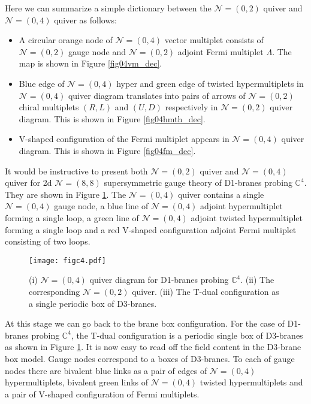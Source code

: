 \documentclass{article}
\numberwithin{equation}{section}
\begin{document}
Here we can summarize a simple dictionary between the 
$\mathcal{N}=(0,2)$ quiver and $\mathcal{N}=(0,4)$ quiver as follows: 

\begin{itemize}

\item A circular orange node of $\mathcal{N}=(0,4)$ vector multiplet consists of 
$\mathcal{N}=(0,2)$ gauge node and $\mathcal{N}=(0,2)$ adjoint Fermi multiplet $\Lambda$. 
The map is shown in Figure \ref{fig04vm_dec}. 


\item Blue edge of $\mathcal{N}=(0,4)$ hyper 
and green edge of twisted hypermultiplets in $\mathcal{N}=(0,4)$ quiver diagram translates into  
pairs of arrows of $\mathcal{N}=(0,2)$ chiral multiplets $(R,L)$ and $(U,D)$ respectively in $\mathcal{N}=(0,2)$ quiver diagram. 
This is shown in Figure \ref{fig04hmth_dec}.

\item V-shaped configuration of the Fermi multiplet appears in $\mathcal{N}=(0,4)$ quiver diagram. 
This is shown in Figure \ref{fig04fm_dec}. 





\end{itemize}


It would be instructive to present both $\mathcal{N}=(0,2)$ quiver and $\mathcal{N}=(0,4)$ quiver for 
2d $\mathcal{N}=(8,8)$ supersymmetric gauge theory of D1-branes probing $\mathbb{C}^{4}$. 
They are shown in Figure \ref{figc4}. 
The $\mathcal{N}=(0,4)$ quiver contains a single $\mathcal{N}=(0,4)$ gauge node, 
a blue line of $\mathcal{N}=(0,4)$ adjoint hypermultiplet forming a single loop, 
a green line of $\mathcal{N}=(0,4)$ adjoint twisted hypermultiplet forming a single loop 
and a red V-shaped configuration adjoint Fermi multiplet consisting of two loops. 
\begin{figure}
\begin{center}
\texttt{[image: figc4.pdf]}
\caption{
(i) $\mathcal{N}=(0,4)$ quiver diagram for D1-branes probing $\mathbb{C}^{4}$. 
(ii) The corresponding $\mathcal{N}=(0,2)$ quiver. 
(iii) The T-dual configuration as a single periodic box of D3-branes. 
}
\label{figc4}
\end{center}
\end{figure}



At this stage we can go back to the brane box configuration. 
For the case of D1-branes probing $\mathbb{C}^{4}$, 
the T-dual configuration is a periodic single box of D3-branes as shown in Figure \ref{figc4}. 
It is now easy to read off the field content in the D3-brane box model. 
Gauge nodes correspond to a boxes of D3-branes. 
To each of gauge nodes there are 
bivalent blue links as a pair of edges of $\mathcal{N}=(0,4)$ hypermultiplets, 
bivalent green links of $\mathcal{N}=(0,4)$ twisted hypermultiplets and 
a pair of V-shaped configuration of Fermi multiplets. 
\end{document}
